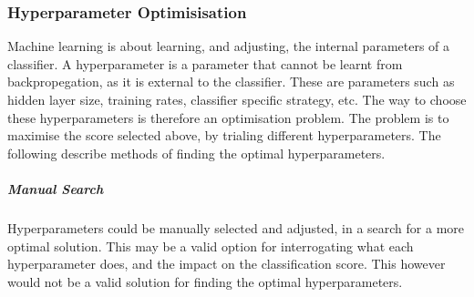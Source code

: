 \documentclass{UoNMCHA}
\numberwithin{equation}{section}
\begin{document}


\subsubsection{Hyperparameter Optimisisation}
 Machine learning is about learning, and adjusting, the internal parameters of a classifier. A hyperparameter is a parameter that cannot be learnt from backpropegation, as it is external to the classifier. These are parameters such as hidden layer size, training rates, classifier specific strategy, etc. The way to choose these hyperparameters is therefore an optimisation problem. The problem is to maximise the score selected above, by trialing different hyperparameters. The following describe methods of finding the optimal hyperparameters.

 \subparagraph{Manual Search}
 Hyperparameters could be manually selected and adjusted, in a search for a more optimal solution. This may be a valid option for interrogating what each hyperparameter does, and the impact on the classification score. This however would not be a valid solution for finding the optimal hyperparameters. \\
\end{document}
